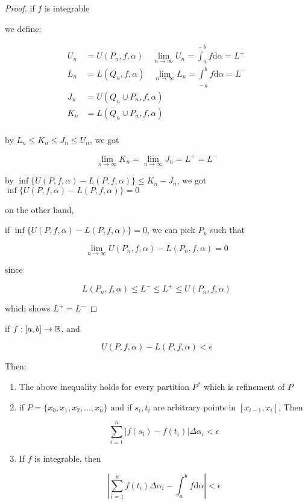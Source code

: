 \begin{proof}
    if $f$ is integrable

    we define:

    \begin{align*}
        U_n &= U(P_n, f, \alpha) \quad \lim_{n \to \infty}U_n = \overline{\int}_a^b f \mathrm{d} \alpha = L^+ \\
        L_n &= L(Q_n, f, \alpha) \quad \lim_{n \to \infty}L_n = \underline{\int}_a^b f \mathrm{d} \alpha = L^- \\
        J_n &= U(Q_n \cup P_n, f, \alpha)  \\
        K_n &= L(Q_n \cup P_n, f, \alpha)  \\
    \end{align*}

    by $L_n \le K_n \le J_n \le U_n$, we got

    \[
        \lim_{n \to \infty}K_n = \lim_{n \to \infty}J_n = L^+ = L^-
    \]

    by $\inf \{ U(P,f, \alpha) - L(P,f,\alpha) \} \le K_n - J_n$, we got $\inf \{ U(P,f, \alpha) - L(P,f,\alpha) \} = 0$

    on the other hand,

    if $\inf \{ U(P,f, \alpha) - L(P,f,\alpha) \} = 0$, we can pick $P_n$ such that

    \[
        \lim_{n \to \infty} U(P_n,f,\alpha) - L(P_n,f,\alpha) = 0
    \]

    since 

    \[
        L(P_n,f,\alpha) \le L^- \le L^+ \le U(P_n, f, \alpha)
    \]

    which shows $L^+ = L^-$

\end{proof}

\begin{thm}
    if $f: [a,b] \to \mathbb{R}$, and

    \[
        U(P,f, \alpha) - L(P,f,\alpha) < \epsilon
    \]

    Then:

    \begin{enumerate}
        \item The above inequality holds for every partition $P^*$ which is refinement of $P$

        \item if $P = \{ x_0,x_1,x_2,...,x_n \}$ and if $s_i, t_i$ are arbitrary points in $[x_{i-1}, x_i]$, Then

        \[
            \sum_{i=1}^{n}\left| f(s_i) - f(t_i) \right| \Delta \alpha_i < \epsilon
        \]

        \item If $f$ is integrable, then

        \[
            \left| \sum_{i=1}^{n} f(t_i)  \Delta \alpha_i - \int_a^b f \mathrm{d}\alpha \right| < \epsilon
        \]
    \end{enumerate}
\end{thm}

